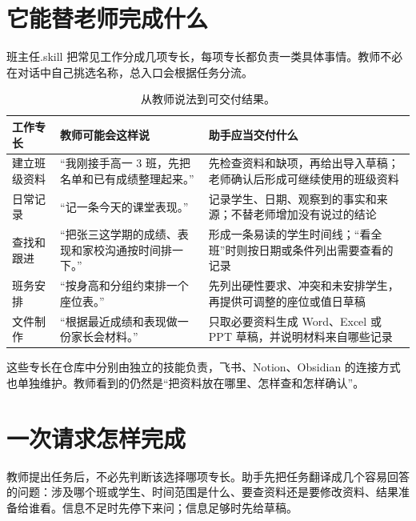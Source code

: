 \documentclass[11pt,a4paper,fontset=none]{ctexart}
\begin{document}
\section{它能替老师完成什么}

班主任.skill 把常见工作分成几项专长，每项专长都负责一类具体事情。教师不必在对话中自己挑选名称，总入口会根据任务分流。

\begin{table}[H]
  \centering
  \small
  \caption{从教师说法到可交付结果。}
  \begin{tabular}{p{3.0cm} p{5.4cm} p{6.1cm}}
    \toprule
    工作专长 & 教师可能会这样说 & 助手应当交付什么 \\
    \midrule
    建立班级资料 & “我刚接手高一 3 班，先把名单和已有成绩整理起来。” & 先检查资料和缺项，再给出导入草稿；老师确认后形成可继续使用的班级资料 \\
    日常记录 & “记一条今天的课堂表现。” & 记录学生、日期、观察到的事实和来源；不替老师增加没有说过的结论 \\
    查找和跟进 & “把张三这学期的成绩、表现和家校沟通按时间排一下。” & 形成一条易读的学生时间线；“看全班”时则按日期或条件列出需要查看的记录 \\
    班务安排 & “按身高和分组约束排一个座位表。” & 先列出硬性要求、冲突和未安排学生，再提供可调整的座位或值日草稿 \\
    文件制作 & “根据最近成绩和表现做一份家长会材料。” & 只取必要资料生成 Word、Excel 或 PPT 草稿，并说明材料来自哪些记录 \\
    \bottomrule
  \end{tabular}
\end{table}

这些专长在仓库中分别由独立的技能负责，飞书、Notion、Obsidian 的连接方式也单独维护。教师看到的仍然是“把资料放在哪里、怎样查和怎样确认”。

\section{一次请求怎样完成}

教师提出任务后，不必先判断该选择哪项专长。助手先把任务翻译成几个容易回答的问题：涉及哪个班或学生、时间范围是什么、要查资料还是要修改资料、结果准备给谁看。信息不足时先停下来问；信息足够时先给草稿。
\end{document}
